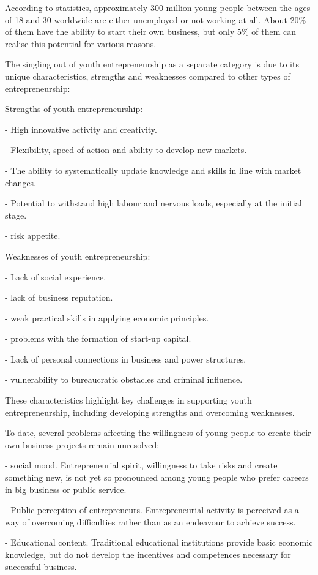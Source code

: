\begin{multicols}{2}
According to statistics, approximately 300 million young people between
the ages of 18 and 30 worldwide are either unemployed or not working at
all. About 20\% of them have the ability to start their own business,
but only 5\% of them can realise this potential for various reasons.

The singling out of youth entrepreneurship as a separate category is due
to its unique characteristics, strengths and weaknesses compared to
other types of entrepreneurship:

Strengths of youth entrepreneurship:

- High innovative activity and creativity.

- Flexibility, speed of action and ability to develop new markets.

- The ability to systematically update knowledge and skills in line with
market changes.

- Potential to withstand high labour and nervous loads, especially at
the initial stage.

- risk appetite.

Weaknesses of youth entrepreneurship:

- Lack of social experience.

- lack of business reputation.

- weak practical skills in applying economic principles.

- problems with the formation of start-up capital.

- Lack of personal connections in business and power structures.

- vulnerability to bureaucratic obstacles and criminal influence.

These characteristics highlight key challenges in supporting youth
entrepreneurship, including developing strengths and overcoming
weaknesses.

To date, several problems affecting the willingness of young people to
create their own business projects remain unresolved:

- social mood. Entrepreneurial spirit, willingness to take risks and
create something new, is not yet so pronounced among young people who
prefer careers in big business or public service.

- Public perception of entrepreneurs. Entrepreneurial activity is
perceived as a way of overcoming difficulties rather than as an
endeavour to achieve success.

- Educational content. Traditional educational institutions provide
basic economic knowledge, but do not develop the incentives and
competences necessary for successful business.


\end{multicols}
